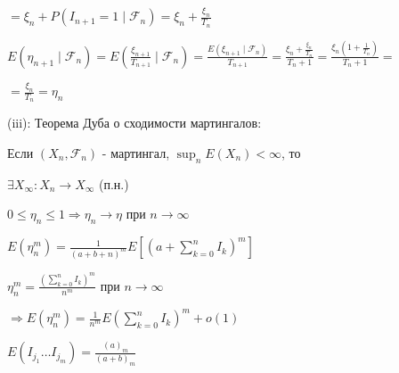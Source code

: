 \documentclass{article}
\begin{document}
$= \xi_n + P(I_{n+1}=1 \mid \mathcal{F}_n) = \xi_n + \frac{\xi_n}{T_n}$

$E(\eta_{n+1} \mid \mathcal{F}_n) = E\left(\frac{\xi_{n+1}}{T_{n+1}} \mid \mathcal{F}_n\right) = \frac{E(\xi_{n+1} \mid \mathcal{F}_n)}{T_{n+1}} = \frac{\xi_n + \frac{\xi_n}{T_n}}{T_n + 1} = \frac{\xi_n(1 + \frac{1}{T_n})}{T_n + 1} =$

$= \frac{\xi_n}{T_n} = \eta_n$

(iii): Теорема Дуба о сходимости мартингалов:

Если $(X_n, \mathcal{F}_n)$ - мартингал, $\sup_n E(X_n) < \infty$, то

$\exists X_\infty : X_n \to X_\infty$ (п.н.)

$0 \le \eta_n \le 1 \Rightarrow \eta_n \to \eta$ при $n \to \infty$

$E(\eta_n^m) = \frac{1}{(a+b+n)^m} E\left[ \left(a + \sum_{k=0}^n I_k\right)^m \right]$

$\eta_n^m = \frac{(\sum_{k=0}^n I_k)^m}{n^m}$ при $n \to \infty$

$\Rightarrow E(\eta_n^m) = \frac{1}{n^m} E\left(\sum_{k=0}^n I_k\right)^m + o(1)$

$E(I_{j_1} \dots I_{j_m}) = \frac{(a)_m}{(a+b)_m}$
\end{document}
